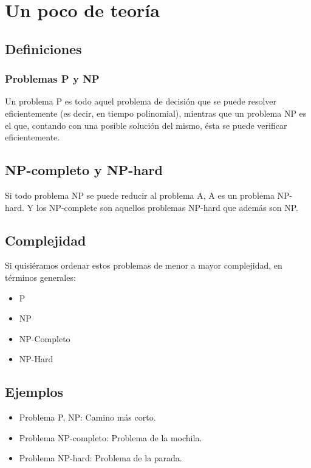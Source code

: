 \section{Un poco de teoría}
\subsection{Definiciones}
\subsubsection{Problemas P y NP}
Un problema P es todo aquel problema de decisión que se puede resolver eficientemente (es decir, en tiempo polinomial), mientras que un problema NP es el que, contando con una posible solución del mismo, ésta se puede verificar eficientemente.\\

\subsection{NP-completo y NP-hard}
Si todo problema NP se puede reducir al problema A, A es un problema NP-hard. Y los NP-complete son aquellos problemas NP-hard que además son NP.\\

\subsection{Complejidad}
Si quisiéramos ordenar estos problemas de menor a mayor complejidad, en términos generales: 
\begin{itemize}
    \item P
    \item NP
    \item NP-Completo
    \item NP-Hard
\end{itemize}

\subsection{Ejemplos}
\begin{itemize}
    \item Problema P, NP: Camino más corto.
    \item Problema NP-completo: Problema de la mochila.
    \item Problema NP-hard: Problema de la parada.
\end{itemize}

